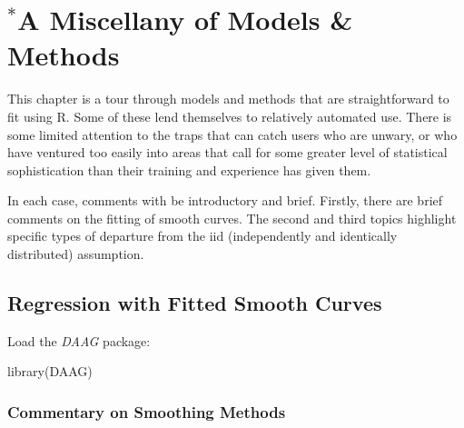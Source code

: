 \documentclass{tufte-book}\usepackage[]{graphicx}\usepackage[]{color}
\newcommand{\txtt}[1]{\texttt{#1}}
\begin{document}
\begin{enumerate}
\end{enumerate}
\cleartooddpage

\chapter[A Miscellany of Models \& Methods]{$^*$A Miscellany of Models \& Methods}





This chapter is a tour through models and methods that are
straightforward to fit using R.  Some of these lend themselves
to relatively automated use.   There is some limited attention
to the traps that can catch users who are unwary, or who have
ventured too easily into areas that call for some greater level
of statistical sophistication than their training and experience
has given them.

In each case, comments with be introductory and brief.  Firstly, there
are brief comments on the fitting of smooth curves.  The second and
third topics highlight specific types of departure from the iid
(independently and identically distributed) assumption.

\section{Regression with Fitted Smooth Curves}

Load the {\em DAAG} package:
\begin{Schunk}
\begin{Sinput}
library(DAAG)
\end{Sinput}
\end{Schunk}

\subsection*{Commentary  on Smoothing Methods}
\end{document}
